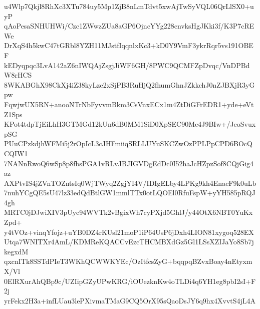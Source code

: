 u4Wlp7Qkjl8RhXc3XTu784uy5Mp1ZjB8nLmTdvt5xwAjTwSyVQL06QrLlSX0+uyP
qAoPesaSNHUHWi/Czc1ZWwzZUa8aGP6OjncYYg228cnvksHgJKki3f/K3P7cREWe
DrXqS4h5kwC47tGRbl8YZH11MJstfIqqnlxKc3+kD0Y9VmF3ykrRqr5vs191OBEF
kEDyqpqc3LvA142aZ6nIWQAjZsgjJiWF6GH/8PWC9QCMFZpDvqc/VnDPBdW8rHCS
8WKABGhX98CkXj4iZ38kyLze2xSjPB3RuHjQ2fhumGhnJZkkchJ0nZJBXjR3yGpw
FqwjwUX5RN+anooNTrNbFyvvmBkm3CsVnxECx1m4ZtDiGFrEDR1+yde+eVtZ1Sps
KPot4tdpTjEiLhH3GTMGd12kUn6dB0MM1SiD0XpSEC90Mc4J9BIw+/JeoSvuxpSG
PUuCPzkdjhWFMi5j2rOpIcL3cJHFmiiqSRLLUYuSKCZwOzPPLPpCPD6BOcQCQIW1
7NANnRwoQ6wSp8p8fbsPGA1vRLvJBJIGVDgEdDc0I52haJcHZpzSof8CQjGig4az
AXPtvIS4jZVnTOZntsIq0WjTWyq2ZgjYI4V/IDIgELby4LPKg9kh4EnacF9k0uLb
7nuhYCgQE5sU47lz33edQdBtlGW1mmlTTx0otLQOEl0RfuFspW+yYH585pRQJ4gh
MRTC0jDJwiXIV3pUyc94WVTk2vBgixWh7cyPXjd5GhlJ/y44OtX6NBT0YuKxZpd+
y4tVOz+vinqYfojz+uYB0DZ4rKUsl21moP1iP64UsP6jDxh4LION81xygoq528EX
Utqa7WNITXr4AmL/KDMReKQACCvEzcTHCMBXdGz5Gl1LSsXZIJaYo8Sb7jkegxdM
qxcnITk8SSTdPIeT3WKhQCWWKYEc/OzItfcsZyG+bqqpqBZvxBoay4nEtyxmX/Vl
0ElRXurAhQBp9c/UZIipGZyUPwKRG/iOUezknKw4oTLDi4q6YH1eg8pbI2sI+F2j
yrFekx2H3a+infLUau3lePXivmaTMaG9CQ5OrX95sQaoDsJY6q9hx4XvvtS4jL4A
